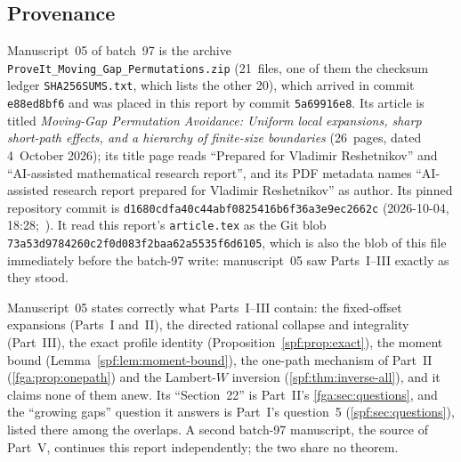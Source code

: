\documentclass[11pt]{article}
\numberwithin{equation}{section}
\theoremstyle{definition}
\theoremstyle{remark}
\theoremstyle{definition}
\begin{document}
\subsection{Provenance}
\label{spf:mg:sec:provenance}

Manuscript~05 of batch~97 is the archive
\nolinkurl{ProveIt_Moving_Gap_Permutations.zip} (21~files, one of them the
checksum ledger \texttt{SHA256SUMS.txt}, which lists the other 20), which
arrived in commit \texttt{e88ed8bf6} and was placed in this report by commit
\texttt{5a69916e8}. Its article is titled \emph{Moving-Gap Permutation
Avoidance: Uniform local expansions, sharp short-path effects, and a hierarchy
of finite-size boundaries} (26~pages, dated 4~October 2026); its title page
reads ``Prepared for Vladimir Reshetnikov'' and ``AI-assisted mathematical
research report'', and its PDF metadata names ``AI-assisted research report
prepared for Vladimir Reshetnikov'' as author. Its pinned repository commit is
\texttt{d1680cdfa40c44abf0825416b6f36a3e9ec2662c} (2026-10-04,
18:28;~\cite{mgProveIt}). It read this report's \texttt{article.tex} as the
Git blob \texttt{73a53d9784260c2f0d083f2baa62a5535f6d6105}, which is also the
blob of this file immediately before the batch-97 write: manuscript~05 saw
Parts~I--III exactly as they stood.

Manuscript~05 states correctly what Parts~I--III contain: the fixed-offset
expansions (Parts~I and~II), the directed rational collapse and integrality
(Part~III), the exact profile identity (Proposition~\ref{spf:prop:exact}), the moment
bound (Lemma~\ref{spf:lem:moment-bound}), the one-path mechanism of Part~II
(\cref{fga:prop:onepath}) and the Lambert-$W$ inversion
(\cref{spf:thm:inverse-all}), and it claims none of them anew. Its
``Section~22'' is Part~II's \cref{fga:sec:questions}, and the ``growing gaps''
question it answers is Part~I's question~5 (\cref{spf:sec:questions}), listed
there among the overlaps. A second batch-97 manuscript, the source of Part~V,
continues this report independently; the two share no theorem.
\end{document}
